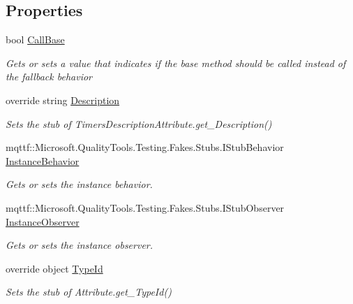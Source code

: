 \subsection*{Properties}
\begin{DoxyCompactItemize}
\item 
bool \hyperlink{class_system_1_1_timers_1_1_fakes_1_1_stub_timers_description_attribute_a1267693c86b4b94bf2de431b9667024c}{Call\-Base}
\begin{DoxyCompactList}\small\item\em Gets or sets a value that indicates if the base method should be called instead of the fallback behavior\end{DoxyCompactList}\item 
override string \hyperlink{class_system_1_1_timers_1_1_fakes_1_1_stub_timers_description_attribute_ae6722f92b91a611c191eaf44e0074fd7}{Description}
\begin{DoxyCompactList}\small\item\em Sets the stub of Timers\-Description\-Attribute.\-get\-\_\-\-Description()\end{DoxyCompactList}\item 
mqttf\-::\-Microsoft.\-Quality\-Tools.\-Testing.\-Fakes.\-Stubs.\-I\-Stub\-Behavior \hyperlink{class_system_1_1_timers_1_1_fakes_1_1_stub_timers_description_attribute_ace5a66800ab451876edeee69c8747f80}{Instance\-Behavior}
\begin{DoxyCompactList}\small\item\em Gets or sets the instance behavior.\end{DoxyCompactList}\item 
mqttf\-::\-Microsoft.\-Quality\-Tools.\-Testing.\-Fakes.\-Stubs.\-I\-Stub\-Observer \hyperlink{class_system_1_1_timers_1_1_fakes_1_1_stub_timers_description_attribute_af45f7ab914df9cf362dbd1766e6999e5}{Instance\-Observer}
\begin{DoxyCompactList}\small\item\em Gets or sets the instance observer.\end{DoxyCompactList}\item 
override object \hyperlink{class_system_1_1_timers_1_1_fakes_1_1_stub_timers_description_attribute_ae2ad0faa5977d4358ed0a516e303cdf7}{Type\-Id}
\begin{DoxyCompactList}\small\item\em Sets the stub of Attribute.\-get\-\_\-\-Type\-Id()\end{DoxyCompactList}\end{DoxyCompactItemize}


